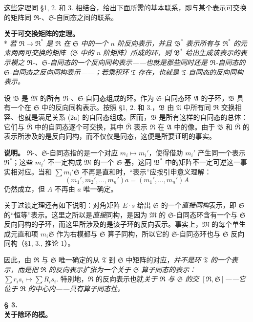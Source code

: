\documentclass[11pt]{article}
\providecommand{\frR}{\mathfrak R}
\providecommand{\frS}{\mathfrak S}
\providecommand{\frT}{\mathfrak T}
\providecommand{\frM}{\mathfrak M}
\providecommand{\frB}{\mathfrak B}
\providecommand{\mA}{\mathfrak A}
\begin{document}
这些定理同 §1, 2. 和 3. 相结合，给出下面所需的基本联系，即与某个表示可交换的矩阵同 \(\frR\)-、\(\frS\)-自同态之间的联系。

\noindent\textbf{关于可交换矩阵的定理。}\\*
\emph{若 \(\frR\to\frR^*\) 是 \(\frR\) 在 \(\frS\) 中的一个 \(n\) 阶反向表示，并且 \(\frB^*\) 表示所有与 \(\frR^*\) 的元素两两可交换的矩阵（\(\frS\) 中的 \(n\) 阶矩阵）所成的环，则 \(\frB^*\) 给出生成该表示的表示模之 \(\frR\)-、\(\frS\)-自同态的一个反向同构表示——也就是那些同时还是 \(\frR\)-自同态的 \(\frS\)-自同态之反向同构表示——；若乘积环 \(\frT\) 存在，也就是 \(\frT\)-自同态的反向同构表示。}

设 \(\frB\) 是 \(\frM\) 的所有 \(\frR\)-、\(\frS\)-自同态组成的环。作为 \(\frS\)-自同态环 \(\mA\) 的子环，\(\frB\) 具有一个在 \(\frS\) 中的反向同构表示。按照 §1, 2. 和 3.，\(\frB\) 由 \(\mA\) 中所有同 \(\frR\) 交换相容、也就是满足关系 (2a) 的自同态组成。因而，\(\frB\) 是所有这样的自同态的总体：它们与 \(\overline{\frR}\) 中的自同态逐个可交换，其中 \(\overline{\frR}\) 表示 \(\frR\) 在 \(\mA\) 中的像。由于 \(\frB\) 和 \(\overline{\frR}\) 的表示所涉及的是反向同构，而不仅仅是同态，这便是所要证明的事实。

\noindent\textbf{说明。} \(\frR\)-、\(\frS\)-自同态指的是一个对应 \(m_i\mapsto m_i'\)，使得借助 \(m_i'\) 产生同一个表示 \(\frR^*\)；这些 \(m_i'\) 不一定构成 \(\frM\) 的一个 \(\frS\)-基，这同 \(\frB^*\) 中的矩阵不一定可逆这一事实相对应。当和 \(\sum m_i'\frS\) 不再是直和时，“表示”应按引申意义理解：
\[
        (m_1',m_2',\ldots,m_n')a=(m_1',\ldots,m_n')A
\]
仍然成立，但 \(A\) 不再由 \(a\) 唯一确定。

关于过渡定理还有如下说明：对角矩阵 \(E\cdot s\) 给出 \(\frS\) 的一个\emph{直接同构}表示，即 \(\frS\) 的“恒等”表示。这里之所以是\emph{直接}同构，是因为 \(\frM\) 的 \(\frS\)-自同态环含有一个与 \(\frS\) 反向同构的子环，而这里所涉及的是该子环的反向表示。事实上，\(\frM\) 的每个单生成元直和项 \(m_i\frS\) 作为右模都与 \(\frS\) 算子同构，所以它的 \(\frS\)-自同态环也与 \(\frS\) 反向同构（§1, 3., 推论 1）。

因此，由 \(\frR\) 与 \(\frS\) 唯一确定的从 \(\frT\) 到 \(\frS\) 中矩阵的对应，\emph{并不是环 \(\frT\) 的一个表示，而是把 \(\frR\) 的反向表示扩张为一个关于 \(\frS\) 算子同态的表示：} \(\sum r_i s_i\longmapsto \sum R_i s_i.\)
特别地，\(\frR\) 的反向表示也就\emph{关于 \(\frR\) 与 \(\frS\) 的交 \([\frR,\frS]\)——它位于 \(\frR\) 的中心内——具有算子同态性。}
\begin{center}
\textbf{§ 3.}\\[0.4em]
\textbf{关于除环的模。}
\end{center}
\end{document}
